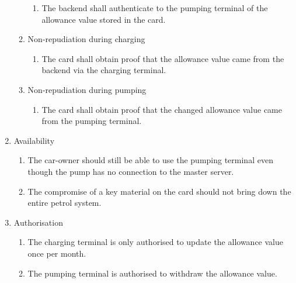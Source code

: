 \begin{enumerate}
\begin{minipage}{\linewidth}
\begin{enumerate}
\begin{enumerate}
		\item The backend shall authenticate to the pumping terminal of the allowance value stored in the card.
		\end{enumerate}
	\item Non-repudiation during charging
		\begin{enumerate}
		\item The card shall obtain proof that the allowance value came from the backend via the charging terminal.
		\end{enumerate}
	\item Non-repudiation during pumping
		\begin{enumerate}
		\item The card shall obtain proof that the changed allowance value came from the pumping terminal.
		\end{enumerate}
	\end{enumerate}
\end{minipage}
\item Availability
	\begin{enumerate}
	\item The car-owner should still be able to use the pumping terminal even though the pump has no connection to the master server.
	\item The compromise of a key material on the card should not bring down the entire petrol system.
	\end{enumerate}	
\item Authorisation
	\begin{enumerate}
	\item The charging terminal is only authorised to update the allowance value once per month.
	\item The pumping terminal is authorised to withdraw the allowance value.
	\end{enumerate}
\end{enumerate}
